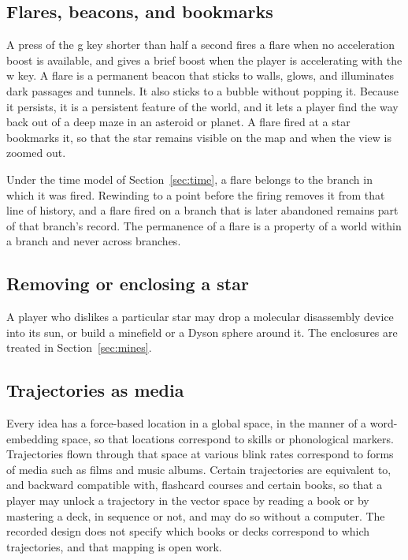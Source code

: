 \documentclass[11pt]{article}
\begin{document}
\subsection{Flares, beacons, and bookmarks}

A press of the g key shorter than half a second fires a flare when no acceleration boost is available, and gives a brief boost when the player is accelerating with the w key. A flare is a permanent beacon that sticks to walls, glows, and illuminates dark passages and tunnels. It also sticks to a bubble without popping it. Because it persists, it is a persistent feature of the world, and it lets a player find the way back out of a deep maze in an asteroid or planet. A flare fired at a star bookmarks it, so that the star remains visible on the map and when the view is zoomed out.

Under the time model of Section~\ref{sec:time}, a flare belongs to the branch in which it was fired. Rewinding to a point before the firing removes it from that line of history, and a flare fired on a branch that is later abandoned remains part of that branch's record. The permanence of a flare is a property of a world within a branch and never across branches.

\subsection{Removing or enclosing a star}

A player who dislikes a particular star may drop a molecular disassembly device into its sun, or build a minefield or a Dyson sphere around it. The enclosures are treated in Section~\ref{sec:mines}.

\subsection{Trajectories as media}

Every idea has a force-based location in a global space, in the manner of a word-embedding space, so that locations correspond to skills or phonological markers. Trajectories flown through that space at various blink rates correspond to forms of media such as films and music albums. Certain trajectories are equivalent to, and backward compatible with, flashcard courses and certain books, so that a player may unlock a trajectory in the vector space by reading a book or by mastering a deck, in sequence or not, and may do so without a computer. The recorded design does not specify which books or decks correspond to which trajectories, and that mapping is open work.
\end{document}
